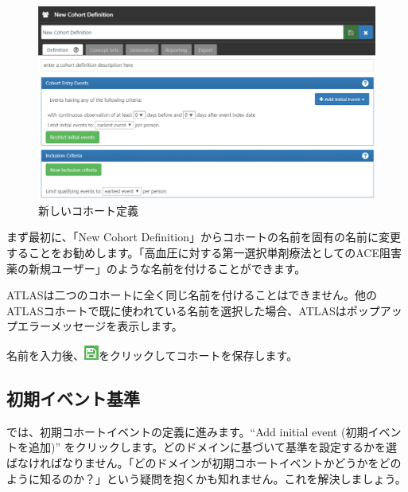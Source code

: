 \documentclass[
  11pt]{book}
\makeatletter
\newenvironment{kframe}{%
\medskip{}
\setlength{\fboxsep}{.8em}
 \def\at@end@of@kframe{}%
 \ifinner\ifhmode%
  \def\at@end@of@kframe{\end{minipage}}%
  \begin{minipage}{\columnwidth}%
 \fi\fi%
 \def\FrameCommand##1{\hskip\@totalleftmargin \hskip-\fboxsep
 \colorbox{myShadeColor}{##1}\hskip-\fboxsep
     \hskip-\linewidth \hskip-\@totalleftmargin \hskip\columnwidth}%
 \MakeFramed {\advance\hsize-\width
   \@totalleftmargin\z@ \linewidth\hsize
   \@setminipage}}%
 {\par\unskip\endMakeFramed%
 \at@end@of@kframe}
\newenvironment{rmdblock}[1]
  {
  \begin{itemize}
  \renewcommand{\labelitemi}{
    \raisebox{-.7\height}[0pt][0pt]{
      {\setkeys{Gin}{width=3em,keepaspectratio}\texttt{[image: images/\#1]}}
    }
  }
  \setlength{\fboxsep}{1em}
  \begin{kframe}
  \item
  }
  {
  \end{kframe}
  \end{itemize}
  }
\newenvironment{rmdimportant}
  {\begin{rmdblock}{important}}
  {\end{rmdblock}}
\theoremstyle{definition}
\theoremstyle{definition}
\theoremstyle{definition}
\theoremstyle{definition}
\theoremstyle{remark}
\makeatother
\begin{document}
\begin{figure}

{\centering \includegraphics[width=1\linewidth]{images/Cohorts/ATLAS-defineacohort} 

}

\caption{新しいコホート定義}\label{fig:ATLASdefineacohort}
\end{figure}

まず最初に、「New Cohort Definition」からコホートの名前を固有の名前に変更することをお勧めします。「高血圧に対する第一選択単剤療法としてのACE阻害薬の新規ユーザー」のような名前を付けることができます。

\begin{rmdimportant}
ATLASは二つのコホートに全く同じ名前を付けることはできません。他のATLASコホートで既に使われている名前を選択した場合、ATLASはポップアップエラーメッセージを表示します。
\end{rmdimportant}

名前を入力後、\includegraphics{images/Cohorts/save.png}をクリックしてコホートを保存します。

\subsection{初期イベント基準}\label{ux521dux671fux30a4ux30d9ux30f3ux30c8ux57faux6e96}

では、初期コホートイベントの定義に進みます。``Add initial event (初期イベントを追加)'' をクリックします。どのドメインに基づいて基準を設定するかを選ばなければなりません。「どのドメインが初期コホートイベントかどうかをどのように知るのか？」という疑問を抱くかも知れません。これを解決しましょう。
\end{document}
